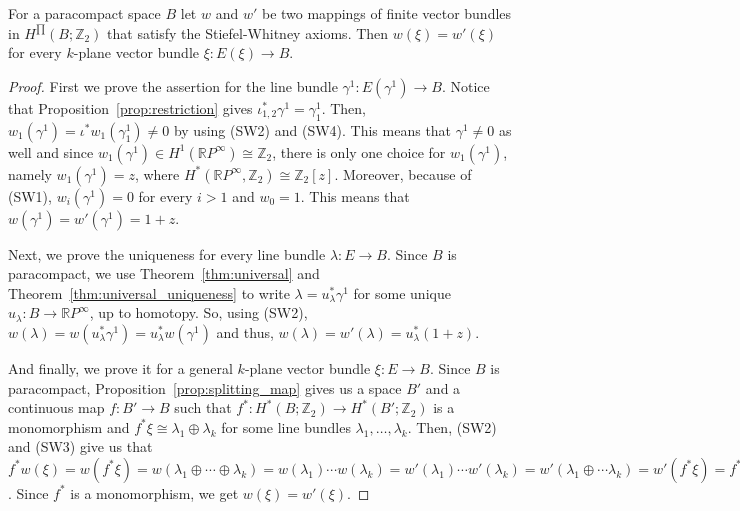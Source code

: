 \begin{theorem} For a paracompact space $B$ let $w$ and $w'$ be two mappings of finite vector bundles in $H^{\prod}(B;\mathbb{Z}_2)$ that satisfy the Stiefel-Whitney axioms. Then $w(\xi)=w'(\xi)$ for every $k$-plane vector bundle $\xi:E(\xi)\to B$.
\end{theorem}
\begin{proof} First we prove the assertion for the line bundle $\gamma^1:E(\gamma^1)\to B$. Notice that Proposition~\ref{prop:restriction} gives $\iota_{1,2}^*\gamma^1=\gamma_1^1$. Then, $w_1(\gamma^1)=\iota^*w_1(\gamma_1^1)\neq0$ by using (SW2) and (SW4). This means that $\gamma^1\neq0$ as well and since $w_1(\gamma^1)\in H^1(\mathbb{R}P^{\infty})\cong\mathbb{Z}_2$, there is only one choice for $w_1(\gamma^1)$, namely $w_1(\gamma^1)=z$, where $H^*(\mathbb{R}P^{\infty},\mathbb{Z}_2)\cong\mathbb{Z}_2[z]$. Moreover, because of (SW1), $w_i(\gamma^1)=0$ for every $i>1$ and $w_0=1$. This means that $w(\gamma^1)=w'(\gamma^1)=1+z$.

Next, we prove the uniqueness for every line bundle $\lambda:E\to B$. Since $B$ is paracompact, we use Theorem~\ref{thm:universal} and Theorem~\ref{thm:universal_uniqueness} to write $\lambda=u_{\lambda}^*\gamma^1$ for some unique $u_{\lambda}:B\to\mathbb{R}P^{\infty}$, up to homotopy. So, using (SW2), $w(\lambda)=w(u_{\lambda}^*\gamma^1)=u_{\lambda}^*w(\gamma^1)$ and thus, $w(\lambda)=w'(\lambda)=u_{\lambda}^*(1+z)$.

And finally, we prove it for a general $k$-plane vector bundle $\xi:E\to B$. Since $B$ is paracompact, Proposition~\ref{prop:splitting_map} gives us a space $B'$ and a continuous map $f:B'\to B$ such that $f^*:H^*(B;\mathbb{Z}_2)\to H^*(B';\mathbb{Z}_2)$ is a monomorphism and $f^*\xi\cong\lambda_1\oplus\lambda_k$ for some line bundles $\lambda_1,\ldots,\lambda_k$. Then, (SW2) and (SW3) give us that $f^*w(\xi)=w(f^*\xi)=w(\lambda_1\oplus\cdots\oplus\lambda_k)=w(\lambda_1)\cdots w(\lambda_k)=w'(\lambda_1)\cdots w'(\lambda_k)=w'(\lambda_1\oplus\cdots\lambda_k)=w'(f^*\xi)=f^*w'(\xi)$. Since $f^*$ is a monomorphism, we get $w(\xi)=w'(\xi)$.
\end{proof}


